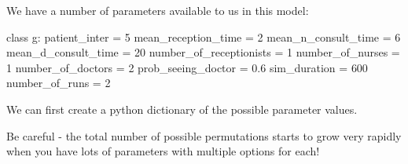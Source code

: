 \documentclass[
  letterpaper,
  DIV=11,
  numbers=noendperiod]{scrreprt}
\newenvironment{Shaded}{\begin{snugshade}}{\end{snugshade}}
\newcommand{\DecValTok}[1]{\textcolor[rgb]{0.68,0.00,0.00}{#1}}
\newcommand{\FloatTok}[1]{\textcolor[rgb]{0.68,0.00,0.00}{#1}}
\newcommand{\KeywordTok}[1]{\textcolor[rgb]{0.00,0.23,0.31}{#1}}
\newcommand{\NormalTok}[1]{\textcolor[rgb]{0.00,0.23,0.31}{#1}}
\newcommand{\OperatorTok}[1]{\textcolor[rgb]{0.37,0.37,0.37}{#1}}
\begin{document}
We have a number of parameters available to us in this model:

\begin{Shaded}
\begin{Highlighting}[]
\KeywordTok{class}\NormalTok{ g:}
\NormalTok{    patient\_inter }\OperatorTok{=} \DecValTok{5}
\NormalTok{    mean\_reception\_time }\OperatorTok{=} \DecValTok{2}
\NormalTok{    mean\_n\_consult\_time }\OperatorTok{=} \DecValTok{6}
\NormalTok{    mean\_d\_consult\_time }\OperatorTok{=} \DecValTok{20}
\NormalTok{    number\_of\_receptionists }\OperatorTok{=} \DecValTok{1}
\NormalTok{    number\_of\_nurses }\OperatorTok{=} \DecValTok{1}
\NormalTok{    number\_of\_doctors }\OperatorTok{=} \DecValTok{2}
\NormalTok{    prob\_seeing\_doctor }\OperatorTok{=} \FloatTok{0.6}
\NormalTok{    sim\_duration }\OperatorTok{=} \DecValTok{600}
\NormalTok{    number\_of\_runs }\OperatorTok{=} \DecValTok{2}
\end{Highlighting}
\end{Shaded}

We can first create a python dictionary of the possible parameter
values.

\begin{tcolorbox}[enhanced jigsaw, rightrule=.15mm, colback=white, colframe=quarto-callout-warning-color-frame, colbacktitle=quarto-callout-warning-color!10!white, toprule=.15mm, coltitle=black, opacityback=0, titlerule=0mm, bottomtitle=1mm, breakable, title=\textcolor{quarto-callout-warning-color}{\faExclamationTriangle}\hspace{0.5em}{Warning}, opacitybacktitle=0.6, toptitle=1mm, arc=.35mm, bottomrule=.15mm, leftrule=.75mm, left=2mm]

Be careful - the total number of possible permutations starts to grow
very rapidly when you have lots of parameters with multiple options for
each!

\end{tcolorbox}
\end{document}
